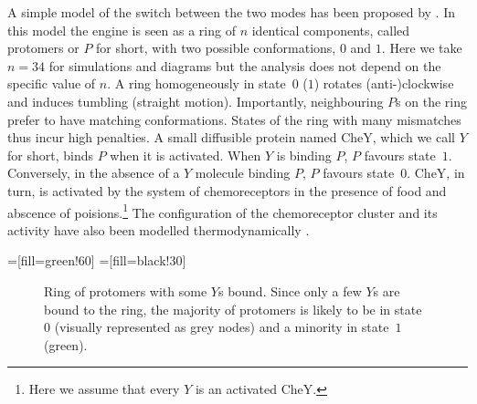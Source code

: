 A simple model of the switch between the two modes
has been proposed by \citet{teuta}.
In this model
the engine is seen as a ring of $n$ identical components,
called protomers or $P$ for short,
with two possible conformations, $0$ and $1$.
Here we take $n=34$ for simulations and diagrams
but the analysis does not depend on the specific value of $n$.
A ring homogeneously in state~$0$ ($1$) rotates (anti-)clockwise
and induces tumbling (straight motion).
Importantly, neighbouring $P$s on the ring prefer to have
matching conformations. %
States of the ring with many mismatches thus incur high penalties.
A small diffusible protein named CheY,
which we call $Y$ for short,
binds $P$ when it is activated.
When $Y$ is binding $P$, $P$ favours state~$1$.
Conversely, in the absence of a $Y$ molecule binding $P$,
$P$ favours state~$0$.
CheY, in turn, is activated by the system of chemoreceptors
in the presence of food and abscence of poisions.\footnote{
  Here we assume that every $Y$ is an activated CheY.}
The configuration of the chemoreceptor cluster and its activity
have also been modelled thermodynamically \citep{sourjik}.

=[fill=green!60]
=[fill=black!30]

\begin{figure}
  \begin{center}
  \end{center}
  \caption{Ring of protomers with some $Y$s bound.
    Since only a few $Y$s are bound to the ring,
    the majority of protomers is likely to be in state~$0$
    (visually represented as grey nodes)
    and a minority in state~$1$ (green).}
  \label{fig:ring}
\end{figure}

